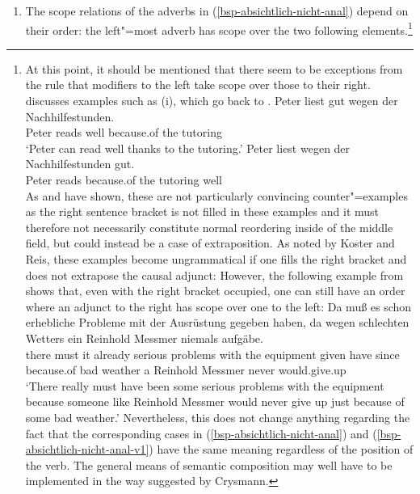 \begin{enumerate}
\item\label{SOV-Skopus} The scope relations of the adverbs in (\ref{bsp-absichtlich-nicht-anal}) depend on their order:
the left"=most adverb has scope over the two following elements.\footnote{%
At this point, it should be mentioned that there seem to be exceptions from the rule that modifiers to the left take scope over those to
their right. \citet*[]{Kasper94a} discusses examples such as (i), which go back to \citet*[]{BV72}.
\eal
\label{bsp-peter-liest-gut-wegen}
\ex 
\gll Peter liest gut wegen der Nachhilfestunden.\\
	 Peter reads well because.of the tutoring\\
\glt `Peter can read well thanks to the tutoring.'
\ex 
\gll Peter liest wegen der Nachhilfestunden gut.\\
	 Peter reads because.of the tutoring well\\
\zl
	As \citet[Section~6]{Koster75a} and \citet*[]{Reis80a} have shown, these are not particularly convincing counter"=examples
	as the right sentence bracket is not filled in these examples and it must therefore not necessarily constitute normal reordering inside
	of the middle field, but could instead be a case of extraposition.
	As noted by Koster and Reis, these examples become ungrammatical if one fills the right bracket and does not extrapose the causal adjunct:
\eal
{}
\zl
However, the following example from \citet[]{Crysmann2004a} shows that, even with the right bracket occupied, one can still have an
order where an adjunct to the right has scope over one to the left:
\ea
\gll Da muß es schon erhebliche Probleme mit der Ausrüstung gegeben haben, da wegen schlechten
  Wetters ein Reinhold Messmer niemals aufgäbe.\\
  there must it already serious problems with the equipment given have since because.of bad weather a Reinhold Messmer never
  would.give.up\\
 \glt `There really must have been some serious problems with the equipment because someone like Reinhold Messmer would never give
  up just because of some bad weather.'
\z
Nevertheless, this does not change anything regarding the fact that the corresponding cases in (\ref{bsp-absichtlich-nicht-anal}) 
and (\ref{bsp-absichtlich-nicht-anal-v1}) have the same meaning regardless of the position of the verb. The general means of semantic
composition may well have to be implemented in the way suggested by Crysmann.

}
\end{enumerate}
